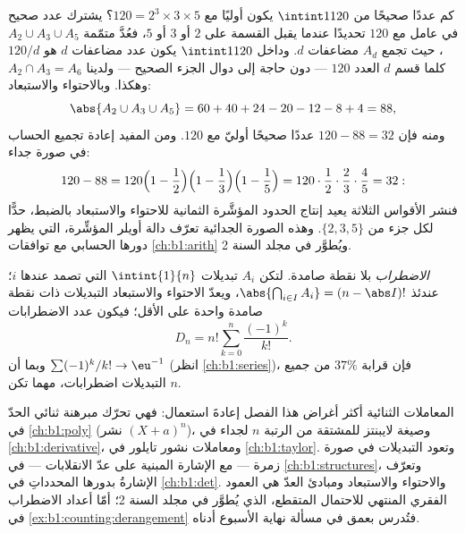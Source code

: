 \begin{example}\label{ex:b1:counting:coprime}
كم عددًا صحيحًا من $\intint1{120}$ يكون أوليًا مع $120 = 2^3
\times 3 \times 5$؟ يشترك عدد صحيح في عامل مع $120$ تحديدًا
عندما يقبل القسمة على $2$ أو $3$ أو $5$، فعُدَّ متمّمة
$A_2 \cup A_3 \cup A_5$، حيث تجمع $A_d$ مضاعفات
$d$. وداخل $\intint1{120}$ يكون عدد مضاعفات $d$ هو $120/d$
كلما قسم $d$ العدد $120$ --- دون حاجة إلى دوال الجزء الصحيح ---
ولدينا $A_2 \cap A_3 = A_6$ وهكذا. وبالاحتواء والاستبعاد:
\[
\abs{A_2 \cup A_3 \cup A_5}
= 60 + 40 + 24 - 20 - 12 - 8 + 4 = 88 ,
\]
ومنه فإن $120 - 88 = 32$ عددًا صحيحًا أوليّ مع $120$. ومن
المفيد إعادة تجميع الحساب في صورة جداء:
\[
120 - 88 = 120\Bigl(1 - \frac12\Bigr)\Bigl(1 -
\frac13\Bigr)\Bigl(1 - \frac15\Bigr) = 120 \cdot \frac12 \cdot
\frac23 \cdot \frac45 = 32 :
\]
فنشر الأقواس الثلاثة يعيد إنتاج الحدود المؤشَّرة الثمانية
للاحتواء والاستبعاد بالضبط، حدًّا لكل جزء من $\{2, 3,
5\}$. وهذه الصورة الجدائية تعرّف دالة أويلر المؤشِّرة، التي يظهر
دورها الحسابي مع توافقات \cref{ch:b1:arith} ويُطوَّر في
مجلد السنة 2.
\end{example}

\begin{example}[الاضطرابات]\label{ex:b1:counting:derangement}
\emph{الاضطراب}  بلا نقطة صامدة. لتكن $A_i$
 تبديلات $\intint{1}{n}$ التي تصمد عندها $i$؛
عندئذ $\abs{\bigcap_{i \in I} A_i} = (n - \abs I)!$، ويعدّ
الاحتواء والاستبعاد التبديلات ذات نقطة صامدة واحدة على الأقل؛
فيكون عدد الاضطرابات
\[
D_n = n! \sum_{k=0}^{n} \frac{(-1)^k}{k!} .
\]
وبما أن $\sum (-1)^k / k! \to \eu^{-1}$ (انظر \cref{ch:b1:series})، فإن قرابة
$37\%$ من جميع التبديلات اضطرابات، مهما تكن $n$.
\end{example}

\begin{remark}\label{rem:b1:counting:whereused}
المعاملات الثنائية أكثر أغراض هذا الفصل إعادةَ استعمال: فهي
تحرّك مبرهنة ثنائي الحدّ في \cref{ch:b1:poly}
(نشر $(X + a)^n$)، وصيغة لايبنتز للمشتقة من الرتبة $n$ لجداء في
\cref{ch:b1:derivative}، ومعاملات نشور تايلور في \cref{ch:b1:taylor}.
وتعود التبديلات في صورة زمرة --- مع الإشارة المبنية على عدّ
الانقلابات --- في \cref{ch:b1:structures}، وتعرّف الإشارةُ بدورها
المحدداتِ في \cref{ch:b1:det}.
والاحتواء والاستبعاد ومبادئ العدّ هي العمود الفقري المنتهي
للاحتمال المتقطع، الذي يُطوَّر في مجلد السنة 2؛
أمّا أعداد الاضطراب في \cref{ex:b1:counting:derangement} فتُدرس
بعمق في مسألة نهاية الأسبوع أدناه.
\end{remark}

